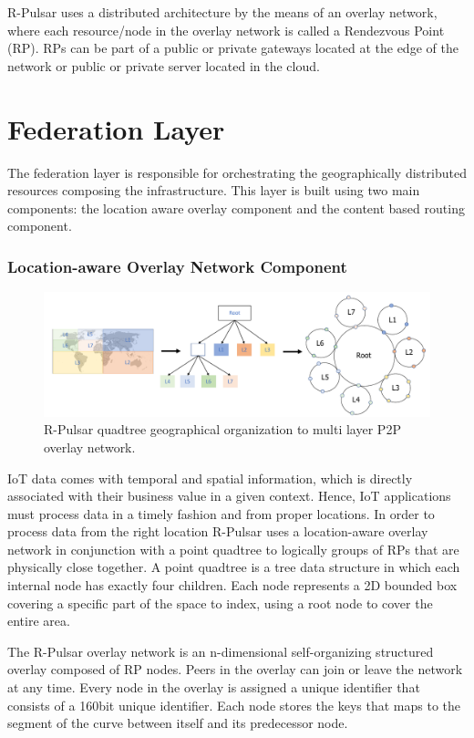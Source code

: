 R-Pulsar uses a distributed architecture by the means of an overlay network, where each resource/node in the overlay network is called a Rendezvous Point (RP). RPs can be part of a public or private gateways located at the edge of the network or public or private server located in the cloud. 

\section{Federation Layer}
The federation layer is responsible for orchestrating the geographically distributed resources composing the infrastructure. This layer is built using two main components: the location aware overlay component and the content based routing component.

\subsubsection{Location-aware Overlay Network Component}

\begin{figure}[!h]
  \centering
  \includegraphics[width=1\columnwidth]{Figures/quadtree.pdf}
  \caption{R-Pulsar quadtree geographical organization to multi layer P2P overlay network.}\label{fig:quadT}
\end{figure}

IoT data comes with temporal and spatial information, which is directly associated with their business value in a given context. Hence, IoT applications must process data in a timely fashion and from proper locations. In order to process data from the right location R-Pulsar uses a location-aware overlay network in conjunction with a point quadtree to logically groups of RPs that are physically close together. A point quadtree is a tree data structure in which each internal node has exactly four children. Each node represents a 2D bounded box covering a specific part of the space to index, using a root node to cover the entire area.

The R-Pulsar overlay network is an n-dimensional self-organizing structured overlay composed of RP nodes. Peers in the overlay can join or leave the network at any time. Every node in the overlay is assigned a unique identifier that consists of a 160bit unique identifier. Each node stores the keys that maps to the segment of the curve between itself and its predecessor node.


